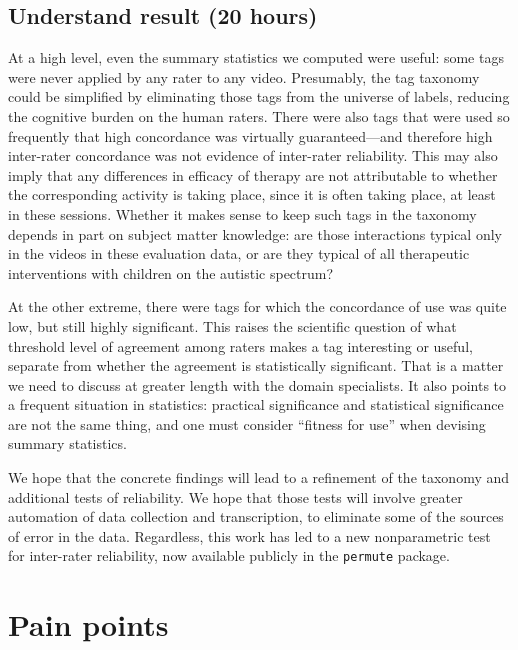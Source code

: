 \documentclass[]{article}
\begin{document}
\subsection{Understand result (20 hours)}\label{subsec:understand-result}

At a high level, even the summary statistics we computed were useful: some
tags were never applied by any rater to any video.
Presumably, the tag taxonomy could be simplified by eliminating those tags
from the universe of labels, reducing the cognitive burden on the human raters.
There were also tags that were used so frequently that high concordance was
virtually guaranteed---and therefore high inter-rater concordance was not evidence
of inter-rater reliability.
This may also imply that any differences in efficacy of therapy are not attributable
to whether the corresponding activity is taking place, since it is often taking place,
at least in these sessions.
Whether it makes sense to keep such tags in the taxonomy depends in part on
subject matter knowledge: are those interactions typical only in the videos in
these evaluation data, or are they typical of all therapeutic interventions with children
on the autistic spectrum?

At the other extreme, there were tags for which the concordance of use was quite
low, but still highly significant. 
This raises the scientific question of what threshold level of agreement among
raters makes a tag interesting or useful, separate from whether the agreement
is statistically significant. 
That is a matter we need to discuss at greater length with the domain specialists.
It also points to a frequent situation in statistics: practical significance and statistical
significance are not the same thing, and one must consider ``fitness for use'' 
when devising summary statistics.

We hope that the concrete findings will lead to a refinement of the taxonomy and
additional tests of reliability.
We hope that those tests will involve greater automation of data collection and transcription,
to eliminate some of the sources of error in the data.
Regardless, this work has led to a new nonparametric test for inter-rater reliability,
now available publicly in the \texttt{permute} package.



\section{Pain points}
\end{document}
